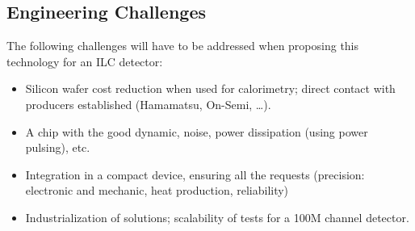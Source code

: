 
\subsection{Engineering Challenges}
The following challenges will have to be addressed when proposing this technology for an ILC detector:
\begin{itemize}
	\item Silicon wafer cost reduction when used for calorimetry; direct contact with producers established (Hamamatsu, On-Semi, \ldots).
	\item A chip with the good dynamic, noise, power dissipation (using power pulsing), etc.
	\item Integration in a compact device, ensuring all the requests (precision: electronic and mechanic, heat production, reliability)
	\item Industrialization of solutions; scalability of tests for a 100M channel detector.
\end{itemize}




